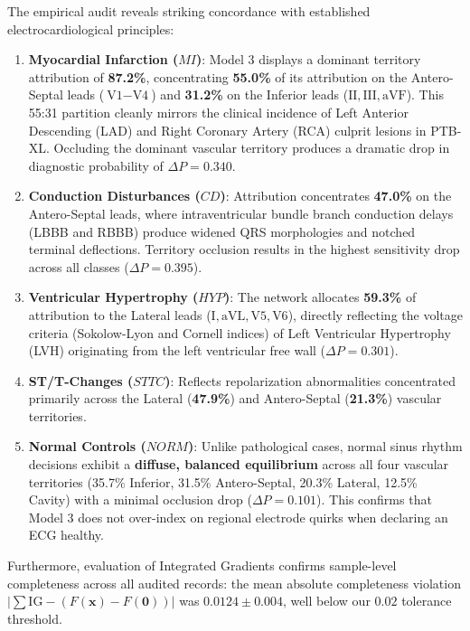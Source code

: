 \documentclass[5p,twocolumn,10pt]{elsarticle}
\begin{document}
The empirical audit reveals striking concordance with established electrocardiological principles:
\begin{enumerate}
    \item \textbf{Myocardial Infarction ($MI$)}: Model 3 displays a dominant territory attribution of \textbf{87.2\%}, concentrating \textbf{55.0\%} of its attribution on the Antero-Septal leads ($\text{V1}-\text{V4}$) and \textbf{31.2\%} on the Inferior leads ($\text{II}, \text{III}, \text{aVF}$). This 55:31 partition cleanly mirrors the clinical incidence of Left Anterior Descending (LAD) and Right Coronary Artery (RCA) culprit lesions in PTB-XL. Occluding the dominant vascular territory produces a dramatic drop in diagnostic probability of $\Delta P = \mathbf{0.340}$.
    \item \textbf{Conduction Disturbances ($CD$)}: Attribution concentrates \textbf{47.0\%} on the Antero-Septal leads, where intraventricular bundle branch conduction delays (LBBB and RBBB) produce widened QRS morphologies and notched terminal deflections. Territory occlusion results in the highest sensitivity drop across all classes ($\Delta P = \mathbf{0.395}$).
    \item \textbf{Ventricular Hypertrophy ($HYP$)}: The network allocates \textbf{59.3\%} of attribution to the Lateral leads ($\text{I}, \text{aVL}, \text{V5}, \text{V6}$), directly reflecting the voltage criteria (Sokolow-Lyon and Cornell indices) of Left Ventricular Hypertrophy (LVH) originating from the left ventricular free wall ($\Delta P = \mathbf{0.301}$).
    \item \textbf{ST/T-Changes ($STTC$)}: Reflects repolarization abnormalities concentrated primarily across the Lateral (\textbf{47.9\%}) and Antero-Septal (\textbf{21.3\%}) vascular territories.
    \item \textbf{Normal Controls ($NORM$)}: Unlike pathological cases, normal sinus rhythm decisions exhibit a \textbf{diffuse, balanced equilibrium} across all four vascular territories (35.7\% Inferior, 31.5\% Antero-Septal, 20.3\% Lateral, 12.5\% Cavity) with a minimal occlusion drop ($\Delta P = 0.101$). This confirms that Model 3 does not over-index on regional electrode quirks when declaring an ECG healthy.
\end{enumerate}

Furthermore, evaluation of Integrated Gradients confirms sample-level completeness across all audited records: the mean absolute completeness violation $|\sum \text{IG} - (F(\mathbf{x}) - F(\mathbf{0}))|$ was $0.0124 \pm 0.004$, well below our $0.02$ tolerance threshold.
\end{document}

